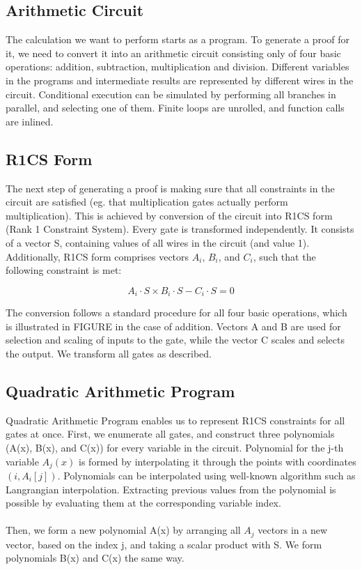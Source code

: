 \subsection{Arithmetic Circuit}

The calculation we want to perform starts as a program. To generate a proof for it, we need to convert it into an arithmetic circuit consisting only of four basic operations: addition, subtraction, multiplication and division. Different variables in the programs and intermediate results are represented by different wires in the circuit. Conditional execution can be simulated by performing all branches in parallel, and selecting one of them. Finite loops are unrolled, and function calls are inlined.

\subsection{R1CS Form}
The next step of generating a proof is making sure that all constraints in the circuit are satisfied (eg. that multiplication gates actually perform multiplication). This is achieved by conversion of the circuit into R1CS form (Rank 1 Constraint System). Every gate is transformed independently. It consists of a vector S, containing values of all wires in the circuit (and value 1). Additionally, R1CS form comprises vectors $A_i$, $B_i$, and $C_i$, such that the following constraint is met:

$$ A_i \cdot S \times B_i \cdot S - C_i \cdot S = 0 $$

The conversion follows a standard procedure for all four basic operations, which is illustrated in FIGURE in the case of addition. Vectors A and B are used for selection and scaling of inputs to the gate, while the vector C scales and selects the output. We transform all gates as described.

\subsection{Quadratic Arithmetic Program}
Quadratic Arithmetic Program enables us to represent R1CS constraints for all gates at once. First, we enumerate all gates, and construct three polynomials (A(x), B(x), and C(x)) for every variable in the circuit. Polynomial for the j-th variable $A_j(x)$ is formed by interpolating it through the points with coordinates $(i, A_i[j])$. 
Polynomials can be interpolated using well-known algorithm such as Langrangian interpolation. Extracting previous values from the polynomial is possible by evaluating them at the corresponding variable index.\\
\\
Then, we form a new polynomial A(x) by arranging all $A_j$ vectors in a new vector, based on the index j, and taking a scalar product with S. We form polynomials B(x) and C(x) the same way.

